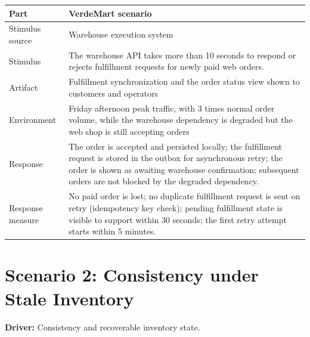 \begin{center}
\begin{tabular}{|p{}|p{}|}
\hline
\textbf{Part} & \textbf{VerdeMart scenario} \\
\hline
Stimulus source & Warehouse execution system \\
\hline
Stimulus & The warehouse API takes more than 10 seconds to respond or rejects fulfillment requests for newly paid web orders. \\
\hline
Artifact & Fulfillment synchronization and the order status view shown to customers and operators \\
\hline
Environment & Friday afternoon peak traffic, with 3 times normal order volume, while the warehouse dependency is degraded but the web shop is still accepting orders \\
\hline
Response & The order is accepted and persisted locally; the fulfillment request is stored in the outbox for asynchronous retry; the order is shown as awaiting warehouse confirmation; subsequent orders are not blocked by the degraded dependency. \\
\hline
Response measure & No paid order is lost; no duplicate fulfillment request is sent on retry (idempotency key check); pending fulfillment state is visible to support within 30 seconds; the first retry attempt starts within 5 minutes. \\
\hline
\end{tabular}
\end{center}

\section{Scenario 2: Consistency under Stale Inventory}

\textbf{Driver:} Consistency and recoverable inventory state.

